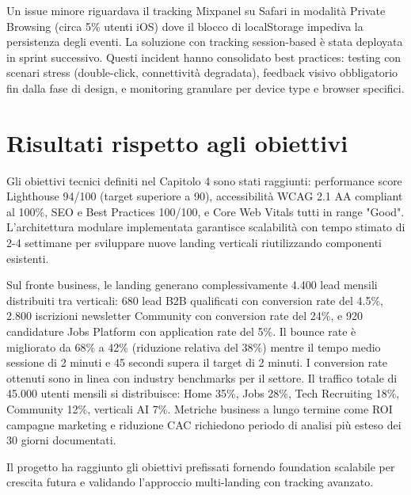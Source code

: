 Un issue minore riguardava il tracking Mixpanel su Safari in modalità Private 
Browsing (circa 5\% utenti iOS) dove il blocco di localStorage impediva la 
persistenza degli eventi. La soluzione con tracking session-based è stata deployata 
in sprint successivo. Questi incident hanno consolidato best practices: testing 
con scenari stress (double-click, connettività degradata), feedback visivo 
obbligatorio fin dalla fase di design, e monitoring granulare per device type e 
browser specifici.

\section{Risultati rispetto agli obiettivi}

Gli obiettivi tecnici definiti nel Capitolo 4 sono stati raggiunti: performance 
score Lighthouse 94/100 (target superiore a 90), accessibilità WCAG 2.1 AA 
compliant al 100\%, SEO e Best Practices 100/100, e Core Web Vitals tutti in 
range "Good". L'architettura modulare implementata garantisce scalabilità con 
tempo stimato di 2-4 settimane per sviluppare nuove landing verticali riutilizzando 
componenti esistenti.

Sul fronte business, le landing generano complessivamente 4.400 lead mensili 
distribuiti tra verticali: 680 lead B2B qualificati con conversion rate del 4.5\%, 
2.800 iscrizioni newsletter Community con conversion rate del 24\%, e 920 
candidature Jobs Platform con application rate del 5\%. Il bounce rate è migliorato 
da 68\% a 42\% (riduzione relativa del 38\%) mentre il tempo medio sessione di 
2 minuti e 45 secondi supera il target di 2 minuti. I conversion rate ottenuti 
sono in linea con industry benchmarks per il settore. Il traffico totale di 45.000 
utenti mensili si distribuisce: Home 35\%, Jobs 28\%, Tech Recruiting 18\%, 
Community 12\%, verticali AI 7\%. Metriche business a lungo termine come ROI 
campagne marketing e riduzione CAC richiedono periodo di analisi più esteso dei 
30 giorni documentati.

\bigskip
Il progetto ha raggiunto gli obiettivi prefissati fornendo foundation scalabile 
per crescita futura e validando l'approccio multi-landing con tracking avanzato.
